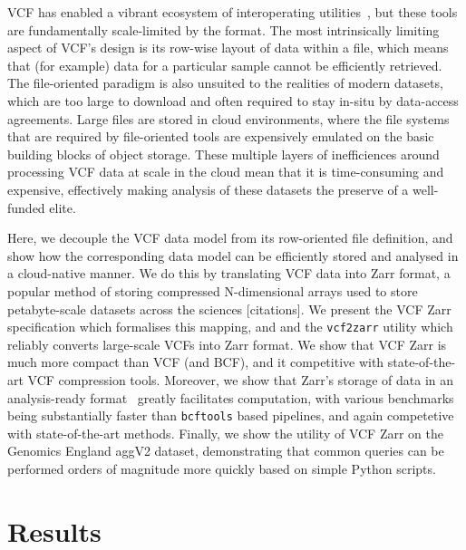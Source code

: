 \documentclass[a4paper,num-refs]{oup-contemporary}
\begin{document}
VCF has enabled a vibrant ecosystem of interoperating
utilities~\cite{danecek2021twelve,garrison2022spectrum}, but these tools
are fundamentally scale-limited by the format. 
The most intrinsically limiting aspect of VCF's design is its 
row-wise layout of data within a file, which means that (for example)
data for a particular sample cannot be efficiently retrieved.
The file-oriented paradigm is also unsuited to the realities 
of modern datasets, which are too large to download and 
often required to stay in-situ by data-access agreements.
Large files are stored in cloud environments, where the 
file systems that are required by file-oriented tools
are expensively emulated on the basic building blocks
of object storage. 
These multiple layers of inefficiences around processing
VCF data at scale in the cloud mean that it is 
time-consuming and expensive, effectively making 
analysis of these datasets the preserve of a well-funded elite.

Here, we decouple the VCF data model from its row-oriented
file definition, and show how the corresponding data model can be 
efficiently stored and analysed in a cloud-native manner.
We do this by translating VCF data into Zarr format,
a popular method of storing compressed N-dimensional arrays
used to store petabyte-scale datasets across the sciences [citations].
We present the VCF Zarr specification which formalises this 
mapping, and and the \texttt{vcf2zarr} 
utility which reliably converts large-scale VCFs into Zarr 
format. We show that VCF Zarr is much more compact than 
VCF (and BCF), and it competitive with state-of-the-art
VCF compression tools. Moreover, we show that Zarr's 
storage of data in an analysis-ready 
format~\cite{abernathey2021cloud} greatly facilitates computation,
with various benchmarks being substantially faster than
\texttt{bcftools} based pipelines, and again competetive
with state-of-the-art methods. Finally, we show the 
utility of VCF Zarr on the Genomics England aggV2 dataset,
demonstrating that common queries can be performed orders
of magnitude more quickly based on simple Python scripts.


\section{Results}
\end{document}
